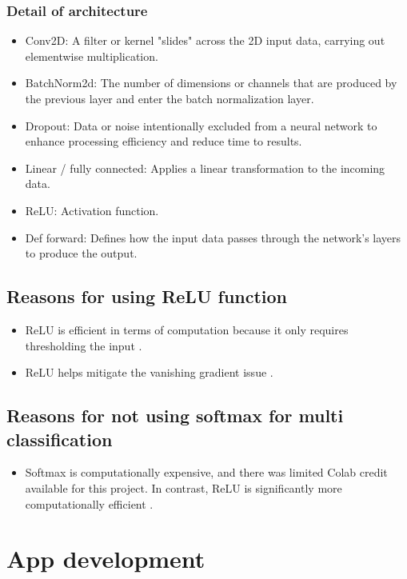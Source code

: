 \documentclass[a4paper,oneside,11pt]{book}
\begin{document}
\subsection{Detail of architecture}
\begin{itemize}
    \item Conv2D: A filter or kernel "slides" across the 2D input data, carrying out elementwise multiplication.
    \item BatchNorm2d: The number of dimensions or channels that are produced by the previous layer and enter the batch normalization layer.
    \item Dropout: Data or noise intentionally excluded from a neural network to enhance processing efficiency and reduce time to results.
    \item Linear / fully connected:  Applies a linear transformation to the incoming data.
    \item ReLU: Activation function.
    \item Def forward:  Defines how the input data passes through the network's layers to produce the output.
\end{itemize}
\section{Reasons for using ReLU function}
\begin{itemize}
    \item ReLU is efficient in terms of computation because it only requires thresholding the input \citep{choubey2023activation}.
    \item ReLU helps mitigate the vanishing gradient issue \citep{choubey2023activation}.
\end{itemize}
\section{Reasons for not using softmax for multi classification}
\begin{itemize}
    \item Softmax is computationally expensive, and there was limited Colab credit available for this project. In contrast, ReLU is significantly more computationally efficient \citep{choubey2023activation}.
\end{itemize}

\chapter{App development}
\end{document}
